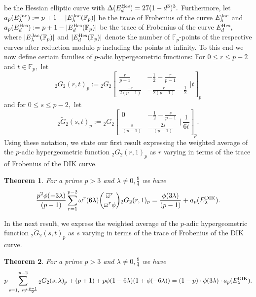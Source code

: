 \documentclass[12pt]{amsart}
\theoremstyle{plain}
\newtheorem{theorem}{Theorem}[section]
\theoremstyle{definition}
\theoremstyle{remark}
\newcommand{\F}{\mathbb{F}}
\newcommand{\hes}{\text{{\rm{Hes}}}}
\newcommand{\jac}{\text{{\rm{Jac}}}}
\newcommand{\dik}{\text{{\rm{DIK}}}}
\numberwithin{equation}{section}
\begin{document}
	be the Hessian elliptic curve with $\Delta(E^{\hes}_d)=27(1-d^3)^3.$ Furthermore, let $a_p(E^{\jac}_\lambda):=p+1-|E^{\jac}_\lambda(\F_p)|$ be the trace of Frobenius of the curve $E^{\jac}_\lambda$ and $a_p(E^{\hes}_d):=p+1-|E^{\hes}_d(\F_p)|$ be the trace of Frobenius of the curve $E^{\hes}_d,$ where $|E^{\jac}_\lambda(\F_p)|$ and $|E^{\hes}_d(\F_p)|$ denote the number of $\F_p$-points of the respective curves after reduction modulo $p$ including the points at infinity. To this end we now define certain families of $p$-adic hypergeometric functions: For $0\leq r\leq p-2$ and $t\in\F_p,$ let 
	$${_2G_2}(r,t)_p:={_2G_2}\left[\begin{array}{cc}
  \frac{r}{p-1}   & -\frac{1}{2} -\frac{r}{p-1}  \\
  \frac{-r}{2(p-1)}    & -\frac{r}{2(p-1)} -\frac{1}{2} \end{array}| t \right]_p$$
  and for $0\leq s\leq p-2,$ let $$\tilde{_2G_2}(s,t)_p:={_2G_2}\left[\begin{array}{cc}
  0   & -\frac{1}{2} -\frac{s}{p-1}  \\
  \frac{s}{(p-1)}    & -\frac{2s}{(p-1)} \end{array}|\ \frac{1}{6t} \right]_p.$$
	Using these notation, we state our first result expressing the weighted average of the $p$-adic hypergeometric function ${_2G_2}(r,1)_p$ as $r$ varying in terms of the trace of Frobenius of the DIK curve. 
	
	\begin{theorem}\label{theorem-DIK-1}
For a prime $p>3$ and $\lambda\neq0,\frac{9}{4}$ we have 
	\begin{align}
\frac{p^2\phi(-3\lambda)}{(p-1)} \sum_{r=1}^{p-2}{\omega}^r(6\lambda)  \binom{\overline{\omega}^r}{\overline{\omega}^r\phi}
{_2G_2}(r,1)_p=\frac{\phi(3\lambda)}{(p-1)} + a_p(E_{\lambda}^{\dik}).\notag
   \end{align}
	\end{theorem}
	In the next result, we express the weighted average of the $p$-adic hypergeometric function $\tilde{_2G_2}(s,t)_p$ as $s$ varying in terms of the trace of Frobenius of the DIK curve. 
	\begin{theorem}\label{theorem-DIK-2}
	For a prime $p>3$ and $\lambda\neq0,\frac{9}{4}$ we have 
	\begin{align}
	p\sum\limits_{s=1,\ s\neq\frac{p-1}{2}}^{p-2}\tilde{_2G_2}(s,\lambda)_p+(p+1)+p \phi(1-6\lambda)(1+\phi(-6\lambda))=(1-p)\cdot\phi(3\lambda)\cdot a_p(E_{\lambda}^{\dik}).\notag
  \end{align}
 	\end{theorem}
	
\end{document}
